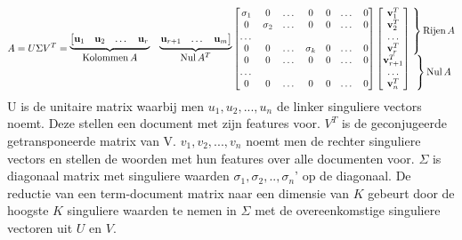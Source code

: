 \[
   A= U\Sigma V^T=
  \begin{matrix}
    \underbrace{\left[\begin{matrix}\vect u_1 & \vect u_2 & \dots & \vect u_r\end{matrix}\right.}& 
    \underbrace{\left.\begin{matrix}\vect u_{r+1} & \dots &  \vect u_m\end{matrix}\right]}\\
    \col A & \nul A^T
  \end{matrix}
  \begin{bmatrix}
      \sigma_1 & 0 & \dots & 0 & 0 & \dots & 0 \\
         0 & \sigma_2  & \dots & 0 & 0 & \dots & 0 \\
         \dots& & & & &  \\
         0 & 0 & \dots & \sigma_k  & 0 & \dots & 0 \\
         0 & 0 & \dots & 0 & 0 & \dots & 0 \\
         \dots& & & & &  \\
         0 & 0 & \dots & 0 & 0 & \dots & 0 
  \end{bmatrix}
  \begin{bmatrix}
    \vect v_1^T \\ \vect v_2^T \\ \dots \\ \vect v_r^T \\
    \vect v_{r+1}^T \\ \dots \\ \vect v_n^T
  \end{bmatrix}
  \begin{matrix}
    \left.\vphantom{\begin{bmatrix}
       \vect v_1^T \\ \vect v_2^T \\ \dots \\ \vect v_r^T 
       \end{bmatrix}}\right\}\row A \\ 
    \left.\vphantom{\begin{bmatrix}
      \vect v_{r+1}^T \\ \dots \\ \vect v_n^T 
    \end{bmatrix}}\right\}\nul A
  \end{matrix}
\] 
\newline
U is de unitaire matrix waarbij men $u_1, u_2, ... , u_n$ de linker singuliere vectors noemt. Deze stellen een document met zijn features voor. $V^T$ is de geconjugeerde getransponeerde matrix van V. $v_1, v_2, ... , v_n$ noemt men de rechter singuliere vectors en stellen de woorden met hun features over alle documenten voor. $\Sigma$ is diagonaal matrix met singuliere waarden $\sigma_1,\sigma_2,..,\sigma_n$'  op de diagonaal. De reductie van een term-document matrix naar een dimensie van $K$ gebeurt door de hoogste $K$ singuliere waarden te nemen in $\Sigma$ met de overeenkomstige singuliere vectoren uit $U$ en $V$.    
